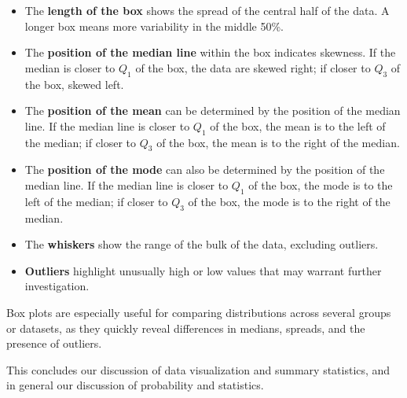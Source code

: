 \begin{itemize}
    \item The \textbf{length of the box} shows the spread of the central half of the data. A longer box means more variability in the middle 50\%.
    \item The \textbf{position of the median line} within the box indicates skewness. If the median is closer to $Q_1$ of the box, the data are skewed right; if closer to $Q_3$ of the box, skewed left.
    \item The \textbf{position of the mean} can be determined by the position of the median line. If the median line is closer to $Q_1$ of the box, the mean is to the left of the median; if closer to $Q_3$ of the box, the mean is to the right of the median.
    \item The \textbf{position of the mode} can also be determined by the position of the median line. If the median line is closer to $Q_1$ of the box, the mode is to the left of the median; if closer to $Q_3$ of the box, the mode is to the right of the median.
    \item The \textbf{whiskers} show the range of the bulk of the data, excluding outliers.
    \item \textbf{Outliers} highlight unusually high or low values that may warrant further investigation.
\end{itemize}

Box plots are especially useful for comparing distributions across several groups or datasets, as they quickly reveal differences in medians, spreads, and the presence of outliers.

This concludes our discussion of data visualization and summary statistics, and in general our discussion of probability and statistics.